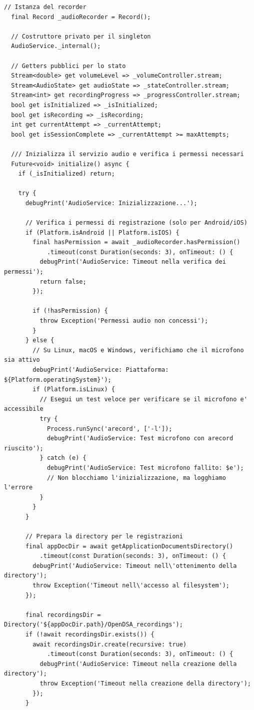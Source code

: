 \documentclass[14pt]{extbook}
\begin{document}
\begin{lstlisting}[caption=audio\_service.dart, label=lst:AudioService]
  // Istanza del recorder
  final Record _audioRecorder = Record();

  // Costruttore privato per il singleton
  AudioService._internal();

  // Getters pubblici per lo stato
  Stream<double> get volumeLevel => _volumeController.stream;
  Stream<AudioState> get audioState => _stateController.stream;
  Stream<int> get recordingProgress => _progressController.stream;
  bool get isInitialized => _isInitialized;
  bool get isRecording => _isRecording;
  int get currentAttempt => _currentAttempt;
  bool get isSessionComplete => _currentAttempt >= maxAttempts;

  /// Inizializza il servizio audio e verifica i permessi necessari
  Future<void> initialize() async {
    if (_isInitialized) return;

    try {
      debugPrint('AudioService: Inizializzazione...');

      // Verifica i permessi di registrazione (solo per Android/iOS)
      if (Platform.isAndroid || Platform.isIOS) {
        final hasPermission = await _audioRecorder.hasPermission()
            .timeout(const Duration(seconds: 3), onTimeout: () {
          debugPrint('AudioService: Timeout nella verifica dei permessi');
          return false;
        });

        if (!hasPermission) {
          throw Exception('Permessi audio non concessi');
        }
      } else {
        // Su Linux, macOS e Windows, verifichiamo che il microfono sia attivo
        debugPrint('AudioService: Piattaforma: ${Platform.operatingSystem}');
        if (Platform.isLinux) {
          // Esegui un test veloce per verificare se il microfono e' accessibile
          try {
            Process.runSync('arecord', ['-l']);
            debugPrint('AudioService: Test microfono con arecord riuscito');
          } catch (e) {
            debugPrint('AudioService: Test microfono fallito: $e');
            // Non blocchiamo l'inizializzazione, ma logghiamo l'errore
          }
        }
      }

      // Prepara la directory per le registrazioni
      final appDocDir = await getApplicationDocumentsDirectory()
          .timeout(const Duration(seconds: 3), onTimeout: () {
        debugPrint('AudioService: Timeout nell\'ottenimento della directory');
        throw Exception('Timeout nell\'accesso al filesystem');
      });

      final recordingsDir = Directory('${appDocDir.path}/OpenDSA_recordings');
      if (!await recordingsDir.exists()) {
        await recordingsDir.create(recursive: true)
            .timeout(const Duration(seconds: 3), onTimeout: () {
          debugPrint('AudioService: Timeout nella creazione della directory');
          throw Exception('Timeout nella creazione della directory');
        });
      }


\end{lstlisting}
\end{document}
